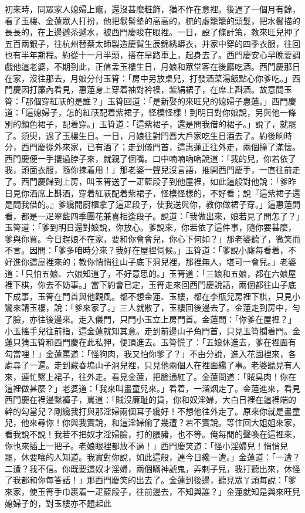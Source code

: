\begin{showcontents}{}
初來時，同眾家人媳婦上竈，還沒甚麼粧飾，猶不作在意裡。後過了一個月有餘，看了玉樓、金蓮眾人打扮，他把䯼髻墊的高高的，梳的虛籠籠的頭髮，把水鬢描的長長的，在上邊遞茶遞水，被西門慶睃在眼裡。一日，設了條計策，教來旺兒押了五百兩銀子，往杭州替蔡太師製造慶賀生辰錦綉蟒衣，并家中穿的四季衣服，往回也有半年期程。約從十一月半頭，搭在旱路車上，起身去了。西門慶安心早晚要調戲他這老婆，不期到此，正值孟玉樓生日，月娘和眾堂客在後廳吃酒。西門慶那日在家，沒往那去，月娘分付玉筲：「房中另放桌兒，打發酒菜湯飯點心你爹吃。」西門慶因打簾內看見，惠蓮身上穿着袖對衿襖，紫絹裙子，在席上斟酒。故意問玉筲：「那個穿紅祆的是誰？」玉筲回道：「是新娶的來旺兒的媳婦子惠蓮。」西門慶道：「這媳婦子，怎的紅祆配着紫裙子，怪模怪樣！到明日對你娘說，另與他一條別的顏色裙子，配着穿。」玉筲道：「這紫裙子，還是問我借的裙子。」說了，就罷了。須臾，過了玉樓生日。一日，月娘往對門喬大戶家吃生日酒去了。約後晌時分，西門慶從外來家，已有酒了；走到儀門首，這惠蓮正往外走，兩個撞了滿懷。西門慶便一手摟過脖子來，就親了個嘴。口中喃喃吶吶說道：「我的兒，你若依了我，頭面衣服，隨你揀着用！」那老婆一聲兒沒言語，推開西門慶手，一直往前走了。西門慶歸到上房，叫玉筲送了一疋藍段子到他屋裡，如此這般對他說：「爹昨日見你酒席上斟酒，穿着紅祆配着紫裙子，怪模怪樣的，不好看；說『這紫裙子還是問我借的。』爹纔開廚櫃拿了這疋段子，使我送與你，教你做裙子穿。」這惠蓮開看，都是一疋翠藍四季團花兼喜相逢段子。說道：「我做出來，娘若見了問怎了？」玉筲道：「爹到明日還對娘說，你放心。爹說來，你若依了這件事，隨你要甚麼，爹與你買。今日趕娘不在家，要和你會會兒，你心下何如？」那老婆聽了，微笑而不言。因問：「爹多咱時分來？我好在屋裡伺候。」玉筲道：「爹說小廝每看着，不好進你這屋裡來的；教你悄悄往山子底下洞兒裡，那裡無人，堪可一會兒。」老婆道：「只怕五娘、六娘知道了，不好意思的。」玉筲道：「三娘和五娘，都在六娘屋裡下棋，你去不妨事。」當下約會已定，玉筲走來回西門慶說話，兩個都往山子底下成事，玉筲在門首與他觀風。都不想金蓮、玉樓，都在李瓶兒房裡下棋，只見小鸞來請玉樓，說：「爹來家了。」三人就散了，玉樓回後邊去了。金蓮走到房中，勻了臉，亦往後邊來。走入儀門，只門小玉立上房門首。金蓮問：「你爹在屋裡？」小玉搖手兒往前指，這金蓮就知其意。走到前邊山子角門首，只見玉筲攔着門。金蓮只猜玉筲和西門慶在此私狎，便頂進去。玉筲慌了：「五娘休進去，爹在裡面有勾當哩！」金蓮罵道：「怪狗肉，我又怕你爹了？」不由分說，進入花園裡來，各處尋了一遍。走到藏春塢山子洞兒裡，只見他兩個人在裡面纔了事。老婆聽見有人來，連忙繫上裙子，往外走。看見金蓮，把臉通紅了。金蓮問道：「賊臭肉！你在這裡做甚麼？」老婆道：「我來叫畫童兒來。」看着，一溜烟走了。金蓮進來，看見西門慶在裡邊繫褲子，罵道：「賊沒廉耻的貨，你和奴淫婦，大白日裡在這裡端的幹的勾當兒？剛纔我打與那淫婦兩個耳子纔好！不想他往外走了。原來你就是畫童兒，他來尋你！你與我實說，和這淫婦偷了幾遭？若不實說。等住回大姐姐來家，看我說不說！我若不把奴才淫婦臉，打的脹豬，也不等。俺每閒的聲喚在這裡來，你也來插上一把子。老娘眼裡都放不過！」西門慶笑道：「怪小淫婦兒！悄悄兒罷，休要嚷的人知道。我實對你說，如此這般，連今日纔一遭。」金蓮道：「一遭？二遭？我不信。你既要這奴才淫婦，兩個瞞神諕鬼，弄剌子兒，我打聽出來，休怪了我都和你每答話！」那西門慶笑的出去了。金蓮到後邊，聽見眾丫頭每說：「爹來家，使玉筲手巾裹着一疋藍段子，往前邊去，不知與誰？」金蓮就知是與來旺兒媳婦子的，對玉樓亦不題起此
\end{showcontents}
